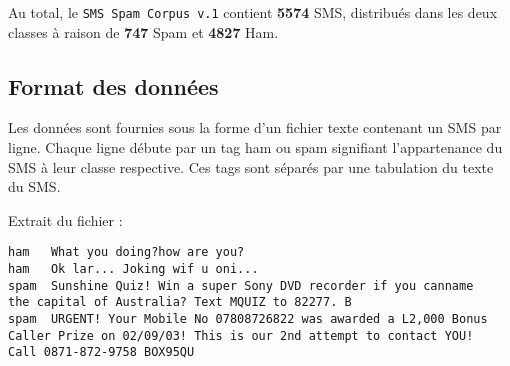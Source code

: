Au total, le \texttt{SMS Spam Corpus v.1} contient \textbf{5574} SMS, distribués dans les deux classes à raison de \textbf{747} Spam et \textbf{4827} Ham.

\subsection*{Format des données}

Les données sont fournies sous la forme d'un fichier texte contenant un SMS par ligne. Chaque ligne débute par un tag \og ham \fg{} ou \og spam \fg{} signifiant l'appartenance du SMS à leur classe respective. Ces tags sont séparés par une tabulation du texte du SMS.

Extrait du fichier :

\begin{verbatim}
ham   What you doing?how are you?
ham   Ok lar... Joking wif u oni...
spam  Sunshine Quiz! Win a super Sony DVD recorder if you canname 
the capital of Australia? Text MQUIZ to 82277. B
spam  URGENT! Your Mobile No 07808726822 was awarded a L2,000 Bonus 
Caller Prize on 02/09/03! This is our 2nd attempt to contact YOU! 
Call 0871-872-9758 BOX95QU
\end{verbatim}
